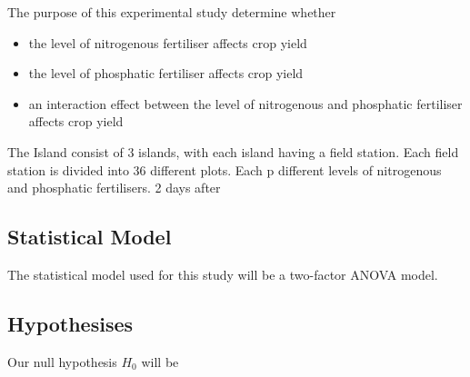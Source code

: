 \documentclass[12pt]{article}
\begin{document}
The purpose of this experimental study determine whether
\begin{itemize}
    \item the level of nitrogenous fertiliser affects crop yield
    \item the level of phosphatic fertiliser affects crop yield
    \item an interaction effect between the level of nitrogenous and phosphatic fertiliser affects crop yield
\end{itemize}
The Island consist of 3 islands, with each island having a field station.
Each field station is divided into 36 different plots.
Each p different levels of nitrogenous and phosphatic fertilisers.
2 days after
\subsection{Statistical Model}
The statistical model used for this study will be a two-factor ANOVA model.

\subsection{Hypothesises}
Our null hypothesis \(H_0\) will be
\end{document}

